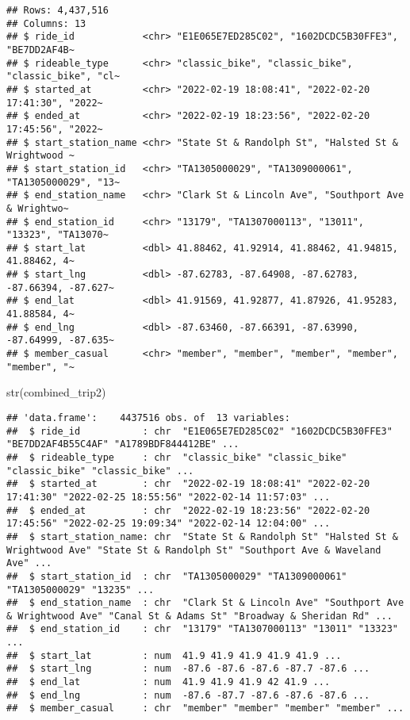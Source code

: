 \documentclass[
]{article}
\newenvironment{Shaded}{\begin{snugshade}}{\end{snugshade}}
\newcommand{\FunctionTok}[1]{\textcolor[rgb]{0.00,0.00,0.00}{#1}}
\newcommand{\NormalTok}[1]{#1}
\begin{document}
\begin{verbatim}
## Rows: 4,437,516
## Columns: 13
## $ ride_id            <chr> "E1E065E7ED285C02", "1602DCDC5B30FFE3", "BE7DD2AF4B~
## $ rideable_type      <chr> "classic_bike", "classic_bike", "classic_bike", "cl~
## $ started_at         <chr> "2022-02-19 18:08:41", "2022-02-20 17:41:30", "2022~
## $ ended_at           <chr> "2022-02-19 18:23:56", "2022-02-20 17:45:56", "2022~
## $ start_station_name <chr> "State St & Randolph St", "Halsted St & Wrightwood ~
## $ start_station_id   <chr> "TA1305000029", "TA1309000061", "TA1305000029", "13~
## $ end_station_name   <chr> "Clark St & Lincoln Ave", "Southport Ave & Wrightwo~
## $ end_station_id     <chr> "13179", "TA1307000113", "13011", "13323", "TA13070~
## $ start_lat          <dbl> 41.88462, 41.92914, 41.88462, 41.94815, 41.88462, 4~
## $ start_lng          <dbl> -87.62783, -87.64908, -87.62783, -87.66394, -87.627~
## $ end_lat            <dbl> 41.91569, 41.92877, 41.87926, 41.95283, 41.88584, 4~
## $ end_lng            <dbl> -87.63460, -87.66391, -87.63990, -87.64999, -87.635~
## $ member_casual      <chr> "member", "member", "member", "member", "member", "~
\end{verbatim}

\begin{Shaded}
\begin{Highlighting}[]
\FunctionTok{str}\NormalTok{(combined\_trip2)}
\end{Highlighting}
\end{Shaded}

\begin{verbatim}
## 'data.frame':    4437516 obs. of  13 variables:
##  $ ride_id           : chr  "E1E065E7ED285C02" "1602DCDC5B30FFE3" "BE7DD2AF4B55C4AF" "A1789BDF844412BE" ...
##  $ rideable_type     : chr  "classic_bike" "classic_bike" "classic_bike" "classic_bike" ...
##  $ started_at        : chr  "2022-02-19 18:08:41" "2022-02-20 17:41:30" "2022-02-25 18:55:56" "2022-02-14 11:57:03" ...
##  $ ended_at          : chr  "2022-02-19 18:23:56" "2022-02-20 17:45:56" "2022-02-25 19:09:34" "2022-02-14 12:04:00" ...
##  $ start_station_name: chr  "State St & Randolph St" "Halsted St & Wrightwood Ave" "State St & Randolph St" "Southport Ave & Waveland Ave" ...
##  $ start_station_id  : chr  "TA1305000029" "TA1309000061" "TA1305000029" "13235" ...
##  $ end_station_name  : chr  "Clark St & Lincoln Ave" "Southport Ave & Wrightwood Ave" "Canal St & Adams St" "Broadway & Sheridan Rd" ...
##  $ end_station_id    : chr  "13179" "TA1307000113" "13011" "13323" ...
##  $ start_lat         : num  41.9 41.9 41.9 41.9 41.9 ...
##  $ start_lng         : num  -87.6 -87.6 -87.6 -87.7 -87.6 ...
##  $ end_lat           : num  41.9 41.9 41.9 42 41.9 ...
##  $ end_lng           : num  -87.6 -87.7 -87.6 -87.6 -87.6 ...
##  $ member_casual     : chr  "member" "member" "member" "member" ...
\end{verbatim}
\end{document}
